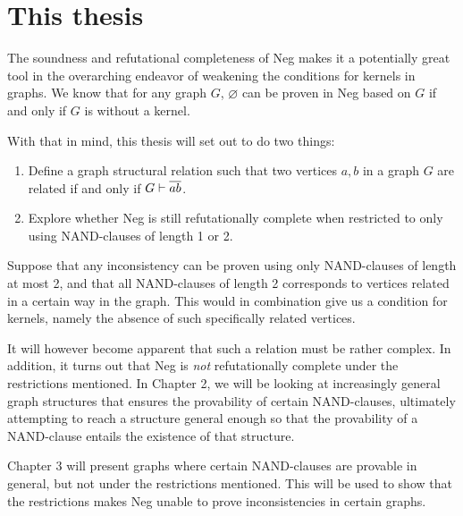 \section{This thesis}
\label{sec:This thesis}
The soundness and refutational completeness of Neg makes it a potentially great tool in the overarching endeavor of weakening the conditions for kernels in graphs.
We know that for any graph $G$, $\varnothing$ can be proven in Neg based on $G$ if and only if $G$ is without a kernel.

With that in mind, this thesis will set out to do two things:
\begin{enumerate}
  \item Define a graph structural relation such that two vertices $a,b$ in a graph $G$ are related if and only if $G \vdash \ol{ab}$.
  \item Explore whether Neg is still refutationally complete when restricted to only using NAND-clauses of length 1 or 2.
\end{enumerate}
Suppose that any inconsistency can be proven using only NAND-clauses of length at most 2, and that all NAND-clauses of length 2 corresponds to vertices related in a certain way in the graph.
This would in combination give us a condition for kernels, namely the absence of such specifically related vertices.

It will however become apparent that such a relation must be rather complex.
In addition, it turns out that Neg is \textit{not} refutationally complete under the restrictions mentioned.
\label{sub:Thesis Overview}
In Chapter 2, we will be looking at increasingly general graph structures that ensures the provability of certain NAND-clauses, ultimately attempting to reach a structure general enough so that the provability of a NAND-clause entails the existence of that structure.

Chapter 3 will present graphs where certain NAND-clauses are provable in general, but not under the restrictions mentioned.
This will be used to show that the restrictions makes Neg unable to prove inconsistencies in certain graphs.
